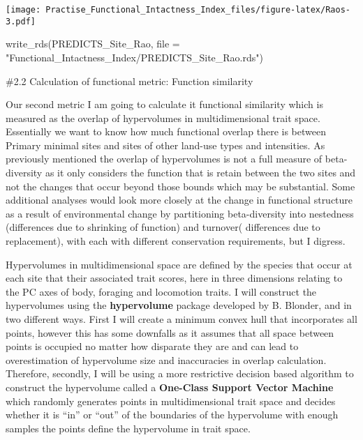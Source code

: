 \documentclass[
]{article}
\newenvironment{Shaded}{\begin{snugshade}}{\end{snugshade}}
\newcommand{\AttributeTok}[1]{\textcolor[rgb]{0.77,0.63,0.00}{#1}}
\newcommand{\FunctionTok}[1]{\textcolor[rgb]{0.00,0.00,0.00}{#1}}
\newcommand{\NormalTok}[1]{#1}
\newcommand{\StringTok}[1]{\textcolor[rgb]{0.31,0.60,0.02}{#1}}
\begin{document}
\texttt{[image: Practise\_Functional\_Intactness\_Index\_files/figure-latex/Raos-3.pdf]}

\begin{Shaded}
\begin{Highlighting}[]
\FunctionTok{write\_rds}\NormalTok{(PREDICTS\_Site\_Rao, }\AttributeTok{file =} \StringTok{"Functional\_Intactness\_Index/PREDICTS\_Site\_Rao.rds"}\NormalTok{)}
\end{Highlighting}
\end{Shaded}

\#2.2 Calculation of functional metric: Function similarity

Our second metric I am going to calculate it functional similarity which
is measured as the overlap of hypervolumes in multidimensional trait
space. Essentially we want to know how much functional overlap there is
between Primary minimal sites and sites of other land-use types and
intensities. As previously mentioned the overlap of hypervolumes is not
a full measure of beta-diversity as it only considers the function that
is retain between the two sites and not the changes that occur beyond
those bounds which may be substantial. Some additional analyses would
look more closely at the change in functional structure as a result of
environmental change by partitioning beta-diversity into nestedness
(differences due to shrinking of function) and turnover( differences due
to replacement), with each with different conservation requirements, but
I digress.

Hypervolumes in multidimensional space are defined by the species that
occur at each site that their associated trait scores, here in three
dimensions relating to the PC axes of body, foraging and locomotion
traits. I will construct the hypervolumes using the \textbf{hypervolume}
package developed by B. Blonder, and in two different ways. First I will
create a minimum convex hull that incorporates all points, however this
has some downfalls as it assumes that all space between points is
occupied no matter how disparate they are and can lead to overestimation
of hypervolume size and inaccuracies in overlap calculation. Therefore,
secondly, I will be using a more restrictive decision based algorithm to
construct the hypervolume called a \textbf{One-Class Support Vector
Machine} which randomly generates points in multidimensional trait space
and decides whether it is ``in'' or ``out'' of the boundaries of the
hypervolume with enough samples the points define the hypervolume in
trait space.
\end{document}
